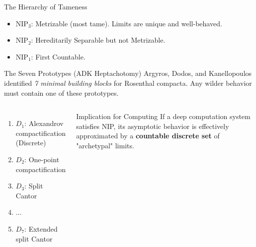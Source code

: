\documentclass{beamer}
\newcommand{\NIP}{\text{NIP}}
\begin{document}
\begin{frame}{The Hierarchy of Tameness}
      \begin{center}
    \end{center}

    \begin{itemize}
    \item $\NIP_3$: Metrizable (most tame).
      Limits are unique and well-behaved.
    \item $\NIP_2$: Hereditarily Separable but not Metrizable.
    \item $\NIP_1$: First Countable.
    \end{itemize}

\end{frame}

\begin{frame}{The Seven Prototypes (ADK Heptachotomy)}
  Argyros, Dodos, and Kanellopoulos identified \emph{7 minimal building blocks} for Rosenthal compacta.
  Any wilder behavior must contain one of these prototypes.
    
    \begin{columns}
        \begin{enumerate}
            \item $D_1$: Alexandrov compactification (Discrete)
            \item $D_2$: One-point compactification
            \item $D_3$: Split Cantor
            \item $\dots$
            \item $D_7$: Extended split Cantor
        \end{enumerate}
        
        \begin{alertblock}{Implication for Computing}
        If a deep computation system satisfies NIP, its asymptotic behavior is effectively approximated by a \textbf{countable discrete set} of "archetypal" limits.
        \end{alertblock}
    \end{columns}
\end{frame}
\end{document}
